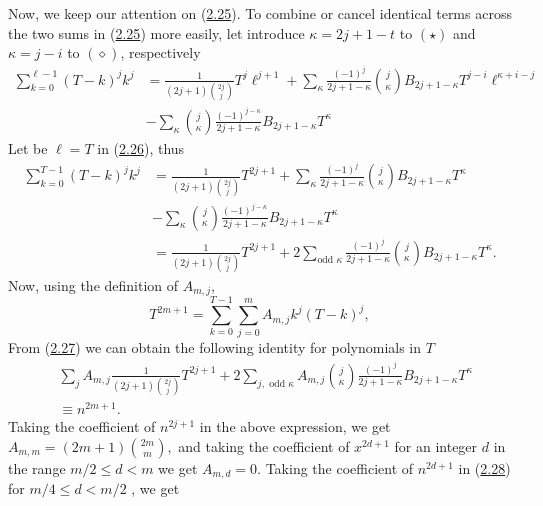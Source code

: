\documentclass[11pt, letterpaper]{amsart}
\theoremstyle{definition}
\theoremstyle{remark}
\numberwithin{equation}{section}
\begin{document}
Now, we keep our attention on (\hyperref[gen_6_1]{2.25}).
To combine or cancel identical terms across the two sums in (\hyperref[gen_6_1]{2.25}) more easily, let introduce $\kappa=2j+1-t$ to $(\star)$ and $\kappa=j-i$ to $(\diamond)$, respectively
\begin{equation}\label{gen_7}
\begin{split}
\sum_{k=0}^{\ell-1} (T-k)^j k^j
&=\frac{1}{(2j+1)\binom{2j}j} T^{j}\ell^{j+1}
+\sum_{\kappa} \frac{(-1)^j}{2j+1-\kappa}\binom{j}{\kappa}B_{2j+1-\kappa}T^{j-i}\ell^{\kappa+i-j} \\
&-\sum_{\kappa} \binom{j}{\kappa} \frac{(-1)^{j-\kappa}}{2j+1-\kappa} B_{2j+1-\kappa}T^{\kappa}
\end{split}
\end{equation}
Let be $\ell=T$ in (\hyperref[gen_7]{2.26}), thus
\begin{equation}\label{gen_7_1}
\begin{split}
\sum_{k=0}^{T-1} (T-k)^j k^j
&=\frac{1}{(2j+1)\binom{2j}j} T^{2j+1}
+\sum_{\kappa} \frac{(-1)^j}{2j+1-\kappa}\binom{j}{\kappa}B_{2j+1-\kappa}T^{\kappa} \\
&-\sum_{\kappa} \binom{j}{\kappa} \frac{(-1)^{j-\kappa}}{2j+1-\kappa} B_{2j+1-\kappa}T^{\kappa}\\
&=\frac{1}{(2j+1)\binom{2j}j} T^{2j+1} + 2\sum_{\text{odd }\kappa}
\frac{(-1)^j}{2j+1-\kappa}\binom{j}{\kappa}B_{2j+1-\kappa}T^{\kappa}.
\end{split}
\end{equation}
Now, using the definition of $A_{m,j}$,
\begin{equation*}
T^{2m+1}=\sum_{k=0}^{T-1}\sum_{j=0}^{m} A_{m,j}k^j(T-k)^j,
\end{equation*}
From (\hyperref[gen_7_1]{2.27}) we can obtain the following identity for polynomials in $T$
\begin{equation}\label{gen_8}
\begin{split}
&\sum_{j}A_{m,j}\frac{1}{(2j+1)\binom{2j}j}T^{2j+1}
+ 2\sum_{j, \text{ odd }\kappa} A_{m,j} \binom{j}{\kappa} \frac{(-1)^j}{2j+1-\kappa} B_{2j+1-\kappa}T^{\kappa}\\
&\equiv n^{2m+1}.
\end{split}
\end{equation}
Taking the coefficient of $n^{2j+1}$ in the above expression, we get $A_{m,m} = (2m+1) \binom{2m}{m},$ and taking the
coefficient of $x^{2d+1}$ for an integer $d$ in the range $m/2 \leq d < m$ we get $A_{m,d}=0$.
Taking the coefficient of $n^{2d+1}$ in (\hyperref[gen_8]{2.28}) for $m/4 \leq d < m/2$ , we get
\end{document}
